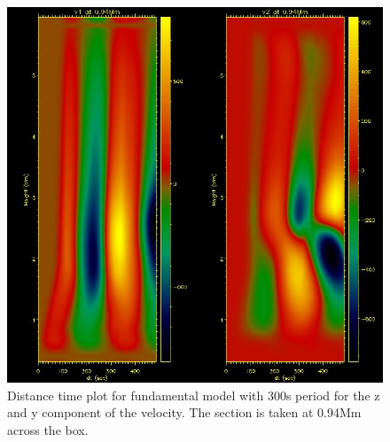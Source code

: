 \documentclass{aa}
\begin{document}
\begin{figure}[h]
\includegraphics[scale=0.5]{images/pm300s_sindrv_n0_5b03d_h1dt.jpg}
\caption{Distance time plot for fundamental model with 300s period for the z and y component of the velocity. The section  is taken at 0.94Mm across the box. }
\end{figure}














\end{document}
